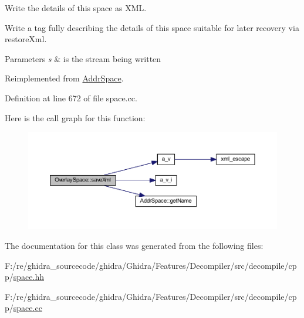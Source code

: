 Write the details of this space as X\+ML. 

Write a tag fully describing the details of this space suitable for later recovery via restore\+Xml. 
\begin{DoxyParams}{Parameters}
{\em s} & is the stream being written \\
\hline
\end{DoxyParams}


Reimplemented from \mbox{\hyperlink{class_addr_space_ac073a4d446677c54d769abba01318864}{Addr\+Space}}.



Definition at line 672 of file space.\+cc.

Here is the call graph for this function\+:
\nopagebreak
\begin{figure}[H]
\begin{center}
\leavevmode
\includegraphics[width=350pt]{class_overlay_space_a60c25f7c85366b0d7dd0fdf2755180b2_cgraph}
\end{center}
\end{figure}


The documentation for this class was generated from the following files\+:\begin{DoxyCompactItemize}
\item 
F\+:/re/ghidra\+\_\+sourcecode/ghidra/\+Ghidra/\+Features/\+Decompiler/src/decompile/cpp/\mbox{\hyperlink{space_8hh}{space.\+hh}}\item 
F\+:/re/ghidra\+\_\+sourcecode/ghidra/\+Ghidra/\+Features/\+Decompiler/src/decompile/cpp/\mbox{\hyperlink{space_8cc}{space.\+cc}}\end{DoxyCompactItemize}
